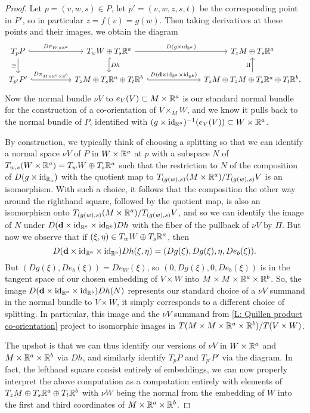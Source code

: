 \begin{proof}
	Let $p = (v,w,s)\in P$, let $p' = (v,w,z,s,t)$ be the corresponding point in $P'$, so in particular $z = f(v) = g(w)$.
	Then taking derivatives at these points and their images, we obtain the diagram
	\[
	\begin{tikzcd}
		T_pP \arrow[r, hook, "D\pi_{W \times \R^a}"] \arrow[d, "\cong" swap] &[1cm]
		T_wW \oplus T_s\R^a \arrow[r, "D(g \times \id_{\R^a})"] \arrow[d, hook, "Dh"] &[1.6cm]
		T_zM \oplus T_s\R^a \\
		T_{p'}P' \arrow[r, hook, "D\pi_{M \times \R^a \times \R^b}"] &
		T_zM \oplus T_s\R^a \oplus T_t\R^b \arrow[r, hook, "D(\diag \times \id_{\R^a} \times \id_{\R^b})"] &
		T_zM \oplus T_zM \oplus T_s\R^a \oplus T_t\R^b. \arrow[u, "\Pi"]
	\end{tikzcd}
	\]
	Now the normal bundle $\nu V$ to $e_V(V) \subset M \times \mathbb{R}^a$ is our standard normal bundle for the construction of a co-orientation of $V \times_M W$, and we know it pulls back to the normal bundle of $P$, identified with $(g \times \mathrm{id}_{\mathbb{R}^a})^{-1}(e_V(V)) \subset W \times \mathbb{R}^a$.

	By construction, we typically think of choosing a splitting so that we can identify a normal space $\nu V$ of $P$ in $W \times \mathbb{R}^a$ at $p$ with a subspace $N$ of $T_{w,s}(W \times \mathbb{R}^a)=T_wW \oplus T_s\mathbb{R}^a$ such that the restriction to $N$ of the composition of $D(g \times \mathrm{id}_{\mathbb{R}_a})$ with the quotient map to $T_{(g(w),s)}(M \times \mathbb{R}^a)/ T_{(g(w),s)}V$ is an isomorphism.
	With such a choice, it follows that the composition the other way around the righthand square, followed by the quotient map, is also an isomorphism onto $T_{(g(w),s)}(M \times \mathbb{R}^a)/ T_{(g(w),s)}V$, and so we can identify the image of $N$ under $D(\mathbf{d} \times \mathrm{id}_{\mathbb{R}^a}\times \mathrm{id}_{\mathbb{R}^b}) Dh$ with the fiber of the pullback of $\nu V$ by $\Pi$. But now we observe that if $(\xi,\eta) \in T_wW \oplus T_s\mathbb{R}^a$, then
	$$D(\mathbf{d} \times \mathrm{id}_{\mathbb{R}^a}\times \mathrm{id}_{\mathbb{R}^b}) Dh(\xi,\eta) = (Dg(\xi),Dg(\xi), \eta, De_b(\xi)).$$
	But $(Dg(\xi),De_b(\xi)) = De_W(\xi)$, so $(0, Dg(\xi),0, De_b(\xi))$ is in the tangent space of our chosen embedding of $V \times W$ into $M \times M \times \mathbb{R}^a \times \mathbb{R}^b$.
	So, the image $D(\mathbf{d} \times \mathrm{id}_{\mathbb{R}^a}\times \mathrm{id}_{\mathbb{R}^b})Dh(N)$ represents our standard choice of a $\nu V$ summand in the normal bundle to $V \times W$, it simply corresponds to a different choice of splitting.
	In particular, this image and the $\nu V$ summand from \cref{L: Quillen product co-orientation} project to isomorphic images in $T(M \times M \times \mathbb{R}^a \times \mathbb{R}^b)/T(V \times W)$.

	The upshot is that we can thus identify our versions of $\nu V$ in $W \times \mathbb{R}^a$ and $M \times \mathbb{R}^a \times \mathbb{R}^b$ via $Dh$, and similarly identify $T_pP$ and $T_{p'}P'$ via the diagram. In fact, the lefthand square consist entirely of embeddings, we can now properly interpret the above computation as a computation entirely with elements of $T_zM \oplus T_s\mathbb{R}^a \oplus T_t\mathbb{R}^b$ with $\nu W$ being the normal from the embedding of $W$ into the first and third coordinates of $M \times \mathbb{R}^a \times \mathbb{R}^b$.
\end{proof}

